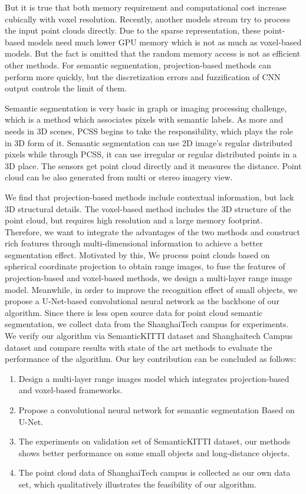 \documentclass[final]{cvpr}
\begin{document}
But it is true that both memory requirement and computational cost increase cubically with voxel resolution. Recently, another models stream try to process the input point clouds directly. Due to the sparse representation, these point-based models need much lower GPU memory which is not as much as voxel-based models. But the fact is omitted that the random memory access is not as efficient other methods. For semantic segmentation, projection-based methods can perform more quickly, but the discretization errors and fuzzification of CNN output controls the limit of them. 

Semantic segmentation is very basic in graph or imaging processing challenge, which is a method which associates pixels with semantic labels. As more and needs in 3D scenes, PCSS begins to take the responsibility, which plays the role in 3D form of it.  Semantic segmentation can use 2D image's regular distributed pixels while through PCSS, it can use irregular or regular distributed points in a 3D place. The sensors get point cloud directly and it measures the distance. Point cloud can be also generated from multi or stereo imagery view\cite{2014Features}.


We find that projection-based methods include contextual information, but lack 3D structural details. The voxel-based method includes the 3D structure of the point cloud, but requires high resolution and a large memory footprint.  Therefore, we want to integrate the advantages of the two methods and construct rich features through multi-dimensional information to achieve a better segmentation effect. Motivated by this, We process point clouds based on spherical coordinate projection to obtain range images, to fuse the features of projection-based and voxel-based methods, we design a multi-layer range image model. Meanwhile, in order to improve the recognition effect of small objects, we propose a U-Net-based convolutional neural network as the backbone of our algorithm. Since there is less open source data for point cloud semantic segmentation, we collect data from the ShanghaiTech campus for experiments.  We verify our algorithm via SemanticKITTI\cite{behley2019iccv}\cite{geiger2012cvpr} dataset and Shanghaitech Campus dataset and compare results with state of the art methods to evaluate the performance of the algorithm.
Our key contribution can be concluded as follows: 
\begin{enumerate}
\item Design a multi-layer range images model which integrates projection-based and voxel-based frameworks. 
\item Propose a convolutional neural network for semantic segmentation Based on U-Net. 
\item The experiments on validation set of SemanticKITTI dataset, our methods shows better performance on some small objects and long-distance objects.
\item The point cloud data of ShanghaiTech campus is collected as our own data set, which qualitatively illustrates the feasibility of our algorithm.
\end{enumerate}
\end{document}
